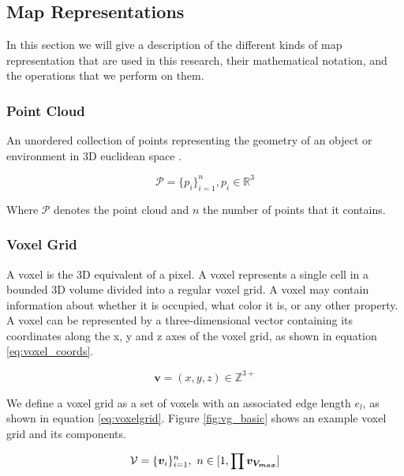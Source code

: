 \subsection{Map Representations}
In this section we will give a description of the different kinds of map representation that are used in this research, their mathematical notation, and the operations that we perform on them.

\subsubsection{Point Cloud}
An unordered collection of points representing the geometry of an object or environment in 3D euclidean space \citep{volodine_point_2007}.

\begin{equation}
\mathcal{P}=\{p_i\}_{i=1}^n, p_i \in \mathbb{R}^3
\end{equation}

Where \(\mathcal{P}\) denotes the point cloud and \(n\) the number of points that it contains.

\subsubsection{Voxel Grid}
A voxel is the 3D equivalent of a pixel. A voxel represents a single cell in a bounded 3D volume divided into a regular voxel grid. A voxel may contain information about whether it is occupied, what color it is, or any other property. A voxel can be represented by a three-dimensional vector containing its coordinates along the x, y and z axes of the voxel grid, as shown in equation \ref{eq:voxel_coords}. 

\begin{equation}
    \label{eq:voxel_coords}
    \boldsymbol{v} = (x, y, z) \in \mathbb{Z}^{3+}
\end{equation}

We define a voxel grid as a set of voxels with an associated edge length \(e_{l}\), as shown in equation \ref{eq:voxelgrid}. Figure \ref{fig:vg_basic} shows an example voxel grid and its components.

\begin{equation}
    \label{eq:voxelgrid}
    \mathcal{V}=\{\boldsymbol{v}_{i}\}_{i=1}^{n},\ n \in [1, \prod{\boldsymbol{v_{V_{max}}}}]
\end{equation}

